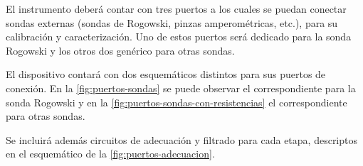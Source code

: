 \documentclass[../et.tex]{subfiles}
\begin{document}
El instrumento deberá contar con tres puertos a los cuales se puedan conectar sondas externas (sondas de Rogowski, pinzas amperométricas, etc.), para su calibración y caracterización. Uno de estos puertos será dedicado para la sonda Rogowski y los otros dos genérico para otras sondas.

El dispositivo contará con dos esquemáticos distintos para sus puertos de conexión. En la \autoref{fig:puertos-sondas} se puede observar el correspondiente para la sonda Rogowski y en la \autoref{fig:puertos-sondas-con-resistencias} el correspondiente para otras sondas.

Se incluirá además circuitos de adecuación y filtrado para cada etapa, descriptos en el esquemático de la \autoref{fig:puertos-adecuacion}.
\end{document}
